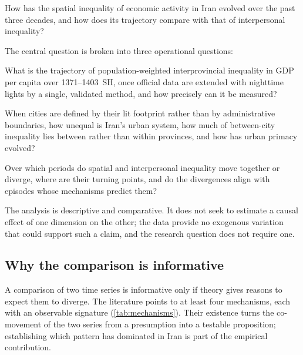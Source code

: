 \documentclass[11pt,a4paper]{article}
\begin{document}
\begin{keybox}[title={Central question}]
How has the spatial inequality of economic activity in Iran evolved over the past three decades, and how does its trajectory compare with that of interpersonal inequality?
\end{keybox}

The central question is broken into three operational questions:

\begin{description}[leftmargin=0pt,labelindent=0pt,font=\sffamily\bfseries\color{navy}]
\item[RQ1 --- Provinces.] What is the trajectory of population-weighted interprovincial inequality in GDP per capita over 1371--1403~SH, once official data are extended with nighttime lights by a single, validated method, and how precisely can it be measured?
\item[RQ2 --- Cities.] When cities are defined by their lit footprint rather than by administrative boundaries, how unequal is Iran's urban system, how much of between-city inequality lies between rather than within provinces, and how has urban primacy evolved?
\item[RQ3 --- Places versus people.] Over which periods do spatial and interpersonal inequality move together or diverge, where are their turning points, and do the divergences align with episodes whose mechanisms predict them?
\end{description}

The analysis is descriptive and comparative. It does not seek to estimate a causal effect of one dimension on the other; the data provide no exogenous variation that could support such a claim, and the research question does not require one.

\subsection{Why the comparison is informative}

A comparison of two time series is informative only if theory gives reasons to expect them to diverge. The literature points to at least four mechanisms, each with an observable signature (\cref{tab:mechanisms}). Their existence turns the co-movement of the two series from a presumption into a testable proposition; establishing which pattern has dominated in Iran is part of the empirical contribution.
\end{document}

